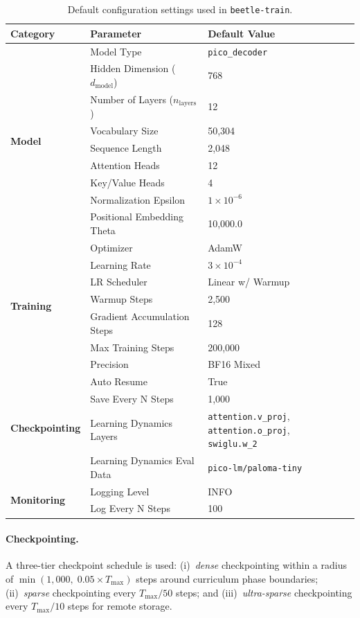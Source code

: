 \begin{table}[h!]
\centering
\small %
\renewcommand{\arraystretch}{1.3}
\begin{tabular}{@{} l l l @{}}
\toprule
\textbf{Category} & \textbf{Parameter} & \textbf{Default Value} \\
\midrule
\multirow{9}{*}{\textbf{Model}}
 & Model Type & \texttt{pico\_decoder} \\
 & Hidden Dimension ($d_{\text{model}}$) & 768 \\
 & Number of Layers ($n_{\text{layers}}$) & 12 \\
 & Vocabulary Size & 50,304 \\
 & Sequence Length & 2,048 \\
 & Attention Heads & 12 \\
 & Key/Value Heads & 4 \\
 & Normalization Epsilon & $1 \times 10^{-6}$ \\
 & Positional Embedding Theta & 10,000.0 \\
\midrule
\multirow{7}{*}{\textbf{Training}}
 & Optimizer & AdamW \\
 & Learning Rate & $3 \times 10^{-4}$ \\
 & LR Scheduler & Linear w/ Warmup \\
 & Warmup Steps & 2,500 \\
 & Gradient Accumulation Steps & 128 \\
 & Max Training Steps & 200,000 \\
 & Precision & BF16 Mixed \\
\midrule
\multirow{4}{*}{\textbf{Checkpointing}}
 & Auto Resume & True \\
 & Save Every N Steps & 1,000 \\
 & Learning Dynamics Layers & \makecell[l]{\texttt{attention.v\_proj}, \texttt{attention.o\_proj}, \\ \texttt{swiglu.w\_2}} \\
 & Learning Dynamics Eval Data & \texttt{pico-lm/paloma-tiny} \\
\midrule
\multirow{2}{*}{\textbf{Monitoring}}
 & Logging Level & INFO \\
 & Log Every N Steps & 100 \\
\bottomrule
\end{tabular}
\caption{Default configuration settings used in \texttt{beetle-train}.}
\label{tab:default_configs}
\end{table}

\paragraph{Checkpointing.}
A three-tier checkpoint schedule is used:
(i)~\emph{dense} checkpointing within a radius of
$\min(1{,}000,\;0.05\!\times\!T_{\max})$ steps around curriculum phase
boundaries;
(ii)~\emph{sparse} checkpointing every $T_{\max}/50$ steps; and
(iii)~\emph{ultra-sparse} checkpointing every $T_{\max}/10$ steps for remote
storage.


